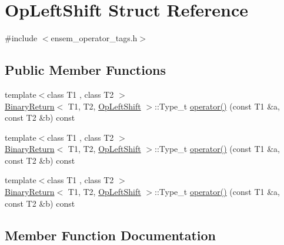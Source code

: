 \hypertarget{structOpLeftShift}{}\section{Op\+Left\+Shift Struct Reference}
\label{structOpLeftShift}


{\ttfamily \#include $<$ensem\+\_\+operator\+\_\+tags.\+h$>$}

\subsection*{Public Member Functions}
\begin{DoxyCompactItemize}
\item 
{\footnotesize template$<$class T1 , class T2 $>$ }\\\mbox{\hyperlink{structBinaryReturn}{Binary\+Return}}$<$ T1, T2, \mbox{\hyperlink{structOpLeftShift}{Op\+Left\+Shift}} $>$\+::Type\+\_\+t \mbox{\hyperlink{structOpLeftShift_a1f91da026aec3d0ff36e700c21152b3c}{operator()}} (const T1 \&a, const T2 \&b) const
\item 
{\footnotesize template$<$class T1 , class T2 $>$ }\\\mbox{\hyperlink{structBinaryReturn}{Binary\+Return}}$<$ T1, T2, \mbox{\hyperlink{structOpLeftShift}{Op\+Left\+Shift}} $>$\+::Type\+\_\+t \mbox{\hyperlink{structOpLeftShift_a1f91da026aec3d0ff36e700c21152b3c}{operator()}} (const T1 \&a, const T2 \&b) const
\item 
{\footnotesize template$<$class T1 , class T2 $>$ }\\\mbox{\hyperlink{structBinaryReturn}{Binary\+Return}}$<$ T1, T2, \mbox{\hyperlink{structOpLeftShift}{Op\+Left\+Shift}} $>$\+::Type\+\_\+t \mbox{\hyperlink{structOpLeftShift_a1f91da026aec3d0ff36e700c21152b3c}{operator()}} (const T1 \&a, const T2 \&b) const
\end{DoxyCompactItemize}


\subsection{Member Function Documentation}
\mbox{\label{structOpLeftShift_a1f91da026aec3d0ff36e700c21152b3c}} 
